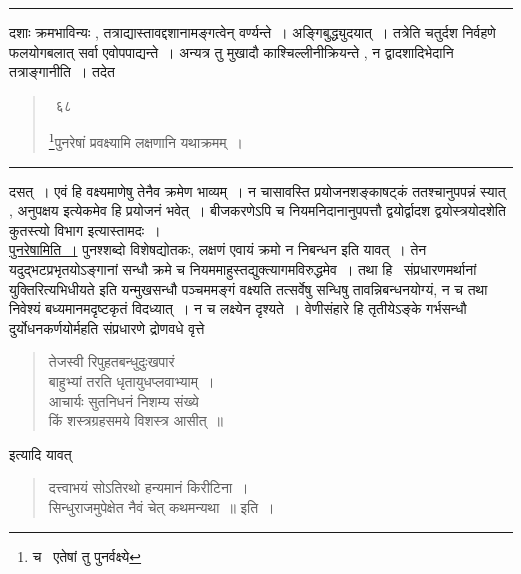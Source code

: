 \documentclass[11pt, openany]{book}
\begin{document}
\hrule

\vspace{2mm}
\noindent
दशाः क्रमभाविन्यः , तत्राद्यास्तावद्दशानामङ्गत्वेन् वर्ण्यन्ते~। अङ्गिबुद्ध्युदयात्~। तत्रेति चतुर्दश निर्वहणे फलयोगबलात् सर्वा एवोपपाद्यन्ते~। अन्यत्र तु मुखादौ काश्चिल्लीनीक्रियन्ते , न द्वादशादिभेदानि तत्राङ्गानीति~। तदेत \textendash

\newpage

\begin{quote}
{~६८

\renewcommand{\thefootnote}{3}\footnote{च \textendash\ एतेषां तु पुनर्वक्ष्ये}पुनरेषां प्रवक्ष्यामि लक्षणानि यथाक्रमम्~।}
\end{quote}

\hrule

\vspace{2mm}
\noindent
दसत्~। एवं हि वक्ष्यमाणेषु तेनैव क्रमेण भाव्यम्~। न चासावस्ति प्रयोजनशङ्काषट्कं ततश्चानुपपन्नं स्यात् , अनुपक्षय इत्येकमेव हि प्रयोजनं भवेत्~। बीजकरणेऽपि च नियमनिदानानुपपत्तौ द्वयोर्द्वादश द्वयोस्त्रयोदशेति कुतस्त्यो विभाग इत्यास्तामदः~।\\

\underline{पुनरेषामिति~।} पुनश्शब्दो विशेषद्योतकः, लक्षणं एवायं क्रमो न निबन्धन इति यावत्~। तेन यदुद्भटप्रभृतयोऽङ्गानां सन्धौ क्रमे च नियममाहुस्तद्युक्त्यागमविरुद्धमेव~। तथा हि \textendash\ {\qt संप्रधारणमर्थानां युक्तिरित्यभिधीयते} इति यन्मुखसन्धौ पञ्चममङ्गं वक्ष्यति तत्सर्वेषु सन्धिषु तावन्निबन्धनयोग्यं, न च तथा निवेश्यं बध्यमानमदृष्टकृतं विदध्यात्~। न च लक्ष्येन दृश्यते~। वेणीसंहारे हि तृतीयेऽङ्के गर्भसन्धौ दुर्योधनकर्णयोर्महति संप्रधारणे द्रोणवधे वृत्ते \textendash

\begin{quote}
{\qt तेजस्वी रिपुहतबन्धुदुःखपारं\\
बाहुभ्यां तरति धृतायुधप्लवाभ्याम्~।\\
आचार्यः सुतनिधनं निशम्य संख्ये\\
किं शस्त्रग्रहसमये विशस्त्र आसीत्~॥}
\end{quote}

\noindent
इत्यादि यावत्\textendash

\begin{quote}
{\qt दत्त्वाभयं सोऽतिरथो हन्यमानं किरीटिना~।\\
सिन्धुराजमुपेक्षेत नैवं चेत् कथमन्यथा~॥} इति~।
\end{quote}
\end{document}
